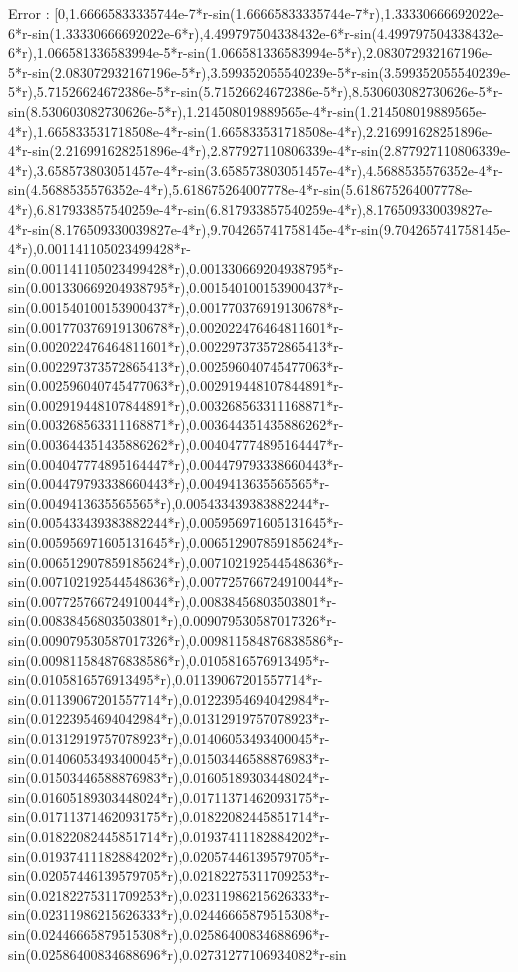 \documentclass[12pt,Times new roman,letterpaper]{book}
\begin{document}
\begin{eulernootebook}
\begin{eulercomment}
\begin{eulercomment}
\begin{eulernootebook}
\begin{eulercomment}
\begin{eulercomment}
\begin{eulercomment}
\begin{eulercomment}
\begin{eulercomment}
\begin{eulercomment}
\begin{eulernotebook}
\begin{eulercomment}
\begin{eulercomment}
\begin{eulercomment}
\begin{eulercomment}
\begin{eulercomment}
\begin{eulercomment}
\begin{eulercomment}
\begin{eulercomment}
\begin{eulercomment}
\begin{eulercomment}
\begin{eulercomment}
\begin{eulercomment}
\begin{eulercomment}
\begin{eulercomment}
\begin{eulercomment}
\begin{eulercomment}
\begin{euleroutput}
  Error : [0,1.66665833335744e-7*r-sin(1.66665833335744e-7*r),1.33330666692022e-6*r-sin(1.33330666692022e-6*r),4.499797504338432e-6*r-sin(4.499797504338432e-6*r),1.066581336583994e-5*r-sin(1.066581336583994e-5*r),2.083072932167196e-5*r-sin(2.083072932167196e-5*r),3.599352055540239e-5*r-sin(3.599352055540239e-5*r),5.71526624672386e-5*r-sin(5.71526624672386e-5*r),8.530603082730626e-5*r-sin(8.530603082730626e-5*r),1.214508019889565e-4*r-sin(1.214508019889565e-4*r),1.665833531718508e-4*r-sin(1.665833531718508e-4*r),2.216991628251896e-4*r-sin(2.216991628251896e-4*r),2.877927110806339e-4*r-sin(2.877927110806339e-4*r),3.658573803051457e-4*r-sin(3.658573803051457e-4*r),4.5688535576352e-4*r-sin(4.5688535576352e-4*r),5.618675264007778e-4*r-sin(5.618675264007778e-4*r),6.817933857540259e-4*r-sin(6.817933857540259e-4*r),8.176509330039827e-4*r-sin(8.176509330039827e-4*r),9.704265741758145e-4*r-sin(9.704265741758145e-4*r),0.001141105023499428*r-sin(0.001141105023499428*r),0.001330669204938795*r-sin(0.001330669204938795*r),0.001540100153900437*r-sin(0.001540100153900437*r),0.001770376919130678*r-sin(0.001770376919130678*r),0.002022476464811601*r-sin(0.002022476464811601*r),0.002297373572865413*r-sin(0.002297373572865413*r),0.002596040745477063*r-sin(0.002596040745477063*r),0.002919448107844891*r-sin(0.002919448107844891*r),0.003268563311168871*r-sin(0.003268563311168871*r),0.003644351435886262*r-sin(0.003644351435886262*r),0.004047774895164447*r-sin(0.004047774895164447*r),0.004479793338660443*r-sin(0.004479793338660443*r),0.0049413635565565*r-sin(0.0049413635565565*r),0.005433439383882244*r-sin(0.005433439383882244*r),0.005956971605131645*r-sin(0.005956971605131645*r),0.006512907859185624*r-sin(0.006512907859185624*r),0.007102192544548636*r-sin(0.007102192544548636*r),0.007725766724910044*r-sin(0.007725766724910044*r),0.00838456803503801*r-sin(0.00838456803503801*r),0.009079530587017326*r-sin(0.009079530587017326*r),0.009811584876838586*r-sin(0.009811584876838586*r),0.0105816576913495*r-sin(0.0105816576913495*r),0.01139067201557714*r-sin(0.01139067201557714*r),0.01223954694042984*r-sin(0.01223954694042984*r),0.01312919757078923*r-sin(0.01312919757078923*r),0.01406053493400045*r-sin(0.01406053493400045*r),0.01503446588876983*r-sin(0.01503446588876983*r),0.01605189303448024*r-sin(0.01605189303448024*r),0.01711371462093175*r-sin(0.01711371462093175*r),0.01822082445851714*r-sin(0.01822082445851714*r),0.01937411182884202*r-sin(0.01937411182884202*r),0.02057446139579705*r-sin(0.02057446139579705*r),0.02182275311709253*r-sin(0.02182275311709253*r),0.02311986215626333*r-sin(0.02311986215626333*r),0.02446665879515308*r-sin(0.02446665879515308*r),0.02586400834688696*r-sin(0.02586400834688696*r),0.02731277106934082*r-sin
\end{euleroutput}
\end{eulercomment}
\end{eulercomment}
\end{eulercomment}
\end{eulercomment}
\end{eulercomment}
\end{eulercomment}
\end{eulercomment}
\end{eulercomment}
\end{eulercomment}
\end{eulercomment}
\end{eulercomment}
\end{eulercomment}
\end{eulercomment}
\end{eulercomment}
\end{eulercomment}
\end{eulercomment}
\end{eulernotebook}
\end{eulercomment}
\end{eulercomment}
\end{eulercomment}
\end{eulercomment}
\end{eulercomment}
\end{eulercomment}
\end{eulernootebook}
\end{eulercomment}
\end{eulercomment}
\end{eulernootebook}
\end{document}
